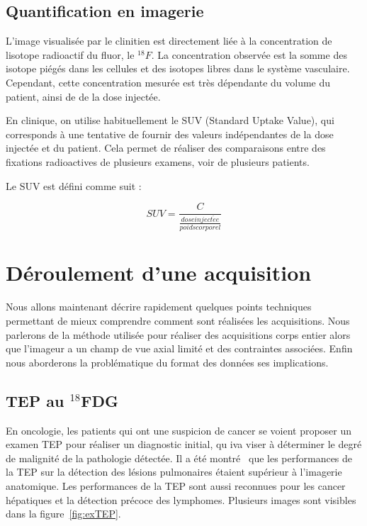 \section{Quantification en imagerie}

L'image visualisée par le clinitien est directement liée à  la concentration de lisotope radioactif du fluor, le $^{18}F$. La concentration observée est la somme des isotope piégés dans les cellules et des isotopes libres dans le système vasculaire. Cependant, cette concentration mesurée est très dépendante du volume du patient, ainsi de de la dose injectée.

En clinique, on utilise habituellement le SUV (Standard Uptake Value), qui corresponds à une tentative de fournir des valeurs indépendantes de la dose injectée et du patient. Cela permet de réaliser des comparaisons entre des fixations radioactives de plusieurs examens, voir de plusieurs patients.

Le SUV est défini comme suit :

\begin{equation}
SUV=\frac{C}{ \frac{dose inject\acute{e}e}{poids corporel} }
\end{equation}


\chapter{Déroulement d'une acquisition}


Nous allons maintenant décrire rapidement quelques points techniques permettant de mieux comprendre comment sont réalisées les acquisitions. Nous parlerons de la méthode utilisée pour réaliser des acquisitions corps entier alors que l'imageur a un champ de vue axial limité et des contraintes associées. Enfin nous aborderons la problématique du format des données ses implications.

\section{TEP au $^{18}$FDG}


En oncologie, les patients qui ont une suspicion de cancer se voient proposer un examen TEP pour réaliser un diagnostic initial, qu iva viser à déterminer le degré de malignité de la pathologie détectée. Il a été montré~\cite{gould2001accuracy} que les performances de la TEP sur la détection des lésions pulmonaires étaient supérieur à l'imagerie anatomique. Les performances de la TEP sont aussi reconnues pour les cancer hépatiques et la détection précoce des lymphomes. Plusieurs images sont visibles dans la figure~\ref{fig:exTEP}.

